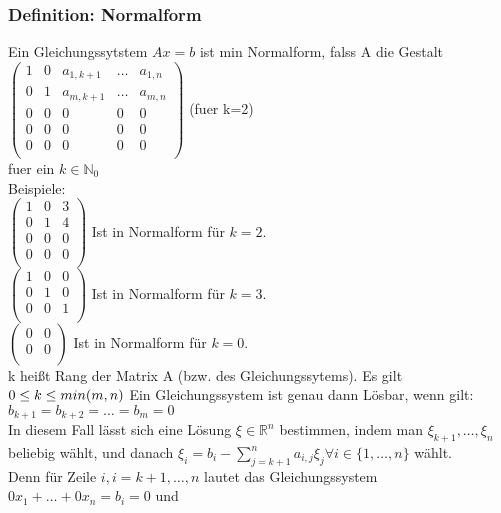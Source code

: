 \documentclass{article}
\newcommand{\N}{\mathbb{N}}
\newcommand{\Rn}{\mathbb{R}^n}
\begin{document}
\subsubsection{Definition: Normalform}
Ein Gleichungssytstem $Ax=b$ ist min Normalform, falss A die Gestalt \\
$
\begin{pmatrix}
1 & 0 & a_{1,k+1}& \dots & a_{1, n}\\
0 & 1 & a_{m, k+1} & \dots & a_{m, n}\\
0 & 0 & 0 & 0 & 0\\
0 & 0 & 0 & 0 & 0\\
0 & 0 & 0 & 0 & 0\\
\end{pmatrix}
$ (fuer k=2)\\
fuer ein $k \in \N_0$\\
Beispiele:\\
$
\begin{pmatrix}
1 & 0 & 3\\
0 & 1 & 4\\
0 & 0 & 0\\
0 & 0 & 0\\
\end{pmatrix}
$ Ist in Normalform für $k = 2$.\\
$
\begin{pmatrix}
1 & 0 & 0\\
0 & 1 & 0\\
0 & 0 & 1\\
\end{pmatrix}
$ Ist in Normalform für $k = 3$.\\
$
\begin{pmatrix}
0 & 0\\
0 & 0\\
\end{pmatrix}
$ Ist in Normalform für $k = 0$.\\
k hei\ss{}t Rang der Matrix A (bzw. des Gleichungssytems). Es gilt \\
$0 \le k \le min(m, n)\\ $
Ein Gleichungssystem ist genau dann Lösbar,  wenn gilt:\\
$
b_{k+1} = b_{k+2} = \dots = b_m = 0
$\\
In diesem Fall lässt sich eine Lösung $\xi \in \Rn$ bestimmen,  indem man $\xi_{k+1}, \dots, \xi_n$ beliebig wählt, und danach $\xi_i = b_i -  \sum_{j=k+1}^n a_{i,j} \xi_j \forall i\in\{1,\dots,n\}$ wählt.\\
Denn für Zeile $i, i=k+1, \dots, n$ lautet das Gleichungssystem $0x_1 + \dots + 0x_n = b_i = 0$ und \\
\end{document}
